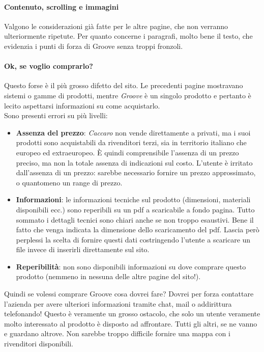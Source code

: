 \paragraph*{Contenuto, scrolling e immagini}
Valgono le considerazioni già fatte per le altre pagine, che non verranno ulteriormente ripetute. Per quanto concerne i paragrafi, molto bene il testo, che evidenzia i punti di forza di Groove senza troppi fronzoli.

\paragraph*{Ok, se voglio comprarlo?}
Questo forse è il più grosso difetto del sito. Le precedenti pagine mostravano sistemi o gamme di prodotti, mentre \textit{Groove} è un singolo prodotto e pertanto è lecito aspettarsi informazioni su come acquistarlo.
\\Sono presenti errori su più livelli:
\begin{itemize}
	\item \textbf{Assenza del prezzo}: \textit{Caccaro} non vende direttamente a privati, ma i suoi prodotti sono acquistabili da rivenditori terzi, sia in territorio italiano che europeo ed extraeuropeo. \`E quindi comprensibile l'assenza di un prezzo preciso, ma non la totale assenza di indicazioni sul costo. L'utente è irritato dall'assenza di un prezzo: sarebbe necessario fornire un prezzo approssimato, o quantomeno un range di prezzo.
	\item \textbf{Informazioni}: le informazioni tecniche sul prodotto (dimensioni, materiali disponibili ecc.) sono reperibili su un pdf a scaricabile a fondo pagina. Tutto sommato i dettagli tecnici sono chiari anche se non troppo esaustivi. Bene il fatto che venga indicata la dimensione dello scaricamento del pdf. Lascia però perplessi la scelta di fornire questi dati costringendo l'utente a scaricare un file invece di inserirli direttamente sul sito.
	\item \textbf{Reperibilità}: non sono disponibili informazioni su dove comprare questo prodotto (nemmeno in nessuna delle altre pagine del sito!).
\end{itemize}
Quindi se volessi comprare Groove cosa dovrei fare? Dovrei per forza contattare l'azienda per avere ulteriori informazioni tramite chat, mail o addirittura telefonando! Questo è veramente un grosso ostacolo, che solo un utente veramente molto interessato al prodotto è disposto ad affrontare. Tutti gli altri, se ne vanno e guardano altrove. Non sarebbe troppo difficile fornire una mappa con i rivenditori disponibili.
